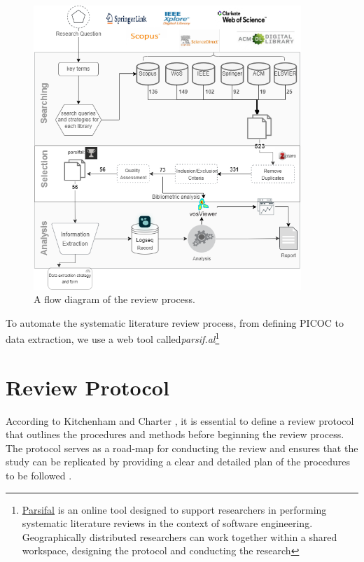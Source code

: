 \begin{figure}[H]
    \centering
    \caption{A flow diagram of the review process.}
    \includegraphics[width=0.9\textwidth]{images/slrmethoddiagram.drawio.png}
    
    \label{fig:slr-proc}
\end{figure}


To automate the systematic literature review process, from defining PICOC to data extraction, we use a web tool called\textit{parsif.al}\footnote{\href{https://parsif.al}{Parsifal} is an online tool designed to support researchers in performing systematic literature reviews in the context of software engineering. Geographically distributed researchers can work together within a shared workspace, designing the protocol and conducting the research}


\section{Review Protocol}
According to Kitchenham and Charter  \cite{kitchenham_guidelines_2007}, it is essential to define a review protocol that outlines the procedures and methods before beginning the review process. The protocol serves as a road-map for conducting the review and ensures that the study can be replicated by providing a clear and detailed plan of the procedures to be followed \cite{carrera-rivera_how-conduct_2022}.


